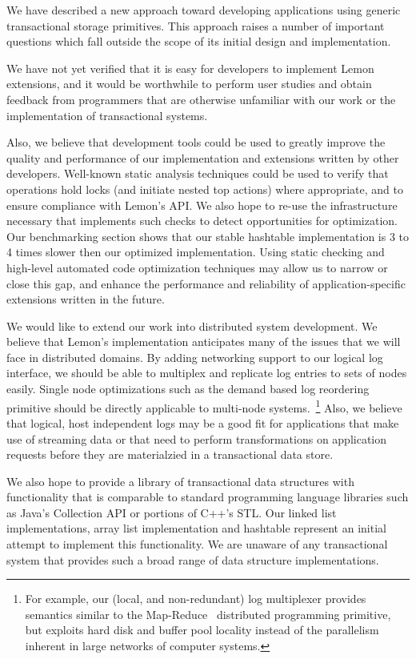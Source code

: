 \documentclass[letterpaper,twocolumn,english]{article}
\newcommand{\yad}{Lemon\xspace}
\begin{document}
We have described a new approach toward developing applications using
generic transactional storage primitives.  This approach raises a
number of important questions which fall outside the scope of its
initial design and implementation.

We have not yet verified that it is easy for developers to implement
\yad extensions, and it would be worthwhile to perform user studies
and obtain feedback from programmers that are otherwise unfamiliar
with our work or the implementation of transactional systems.

Also, we believe that development tools could be used to greatly
improve the quality and performance of our implementation and
extensions written by other developers.  Well-known static analysis
techniques could be used to verify that operations hold locks (and
initiate nested top actions) where appropriate, and to ensure
compliance with \yad's API.  We also hope to re-use the infrastructure
necessary that implements such checks to detect opportunities for
optimization.  Our benchmarking section shows that our stable
hashtable implementation is 3 to 4 times slower then our optimized
implementation.  Using static checking and high-level automated code
optimization techniques may allow us to narrow or close this
gap, and enhance the performance and reliability of application-specific 
extensions written in the future.

We would like to extend our work into distributed system
development.  We believe that \yad's implementation anticipates many
of the issues that we will face in distributed domains.  By adding 
networking support to our logical log interface,
we should be able to multiplex and replicate log entries to sets of
nodes easily.  Single node optimizations such as the demand based log
reordering primitive should be directly applicable to multi-node
systems.~\footnote{For example, our (local, and non-redundant) log
multiplexer provides semantics similar to the
Map-Reduce~\cite{mapReduce} distributed programming primitive, but
exploits hard disk and buffer pool locality instead of the parallelism
inherent in large networks of computer systems.}  Also, we believe
that logical, host independent logs may be a good fit for applications
that make use of streaming data or that need to perform
transformations on application requests before they are materialzied
in a transactional data store.

We also hope to provide a library of
transactional data structures with functionality that is comparable to
standard programming language libraries such as Java's Collection API
or portions of C++'s STL.  Our linked list implementations, array list
implementation and hashtable represent an initial attempt to implement
this functionality.  We are unaware of any transactional system that
provides such a broad range of data structure implementations.  
\end{document}
